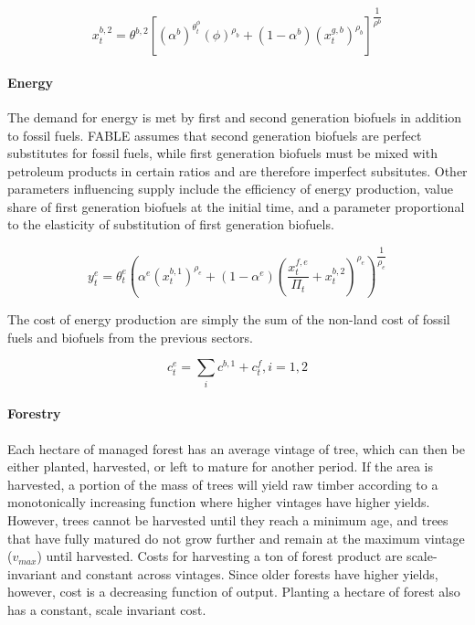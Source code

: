 \documentclass[10pt]{article}
\begin{document}
\begin{equation}
x_t^{b,2} = \theta^{b,2} \left [ \left (\alpha^b \right )^{\theta_t^\phi} \left(\phi \right )^{\rho_b} + \left (1-\alpha^b \right ) \left (x_t^{g,b} \right )^{\rho_b} \right ]^{\dfrac{1}{\rho^b}}
\end{equation}

\paragraph{Energy}

The demand for energy is met by first and second generation biofuels in addition to fossil fuels. FABLE assumes that second generation biofuels are perfect substitutes for fossil fuels, while first generation biofuels must be mixed with petroleum products in certain ratios and are therefore imperfect subsitutes. Other parameters influencing supply include the efficiency of energy production, value share of first generation biofuels at the initial time, and a parameter proportional to the elasticity of substitution of first generation biofuels. 

\begin{equation}
y_t^e = \theta_t^e \left ( \alpha^e \left (x_t^{b,1} \right )^{\rho_e} + \left (1-\alpha^e \right ) \left (\dfrac{x_t^{f,e}}{\Pi_t} + x_t^{b,2} \right )^{\rho_e} \right )^{\dfrac{1}{\rho_e}}
\end{equation}

The cost of energy production are simply the sum of the non-land cost of fossil fuels and biofuels from the previous sectors.

\begin{equation}
c_t^e = \sum \limits_i c^{b,1} + c_t^f , i = 1, 2
\end{equation}

\paragraph{Forestry}

Each hectare of managed forest has an average vintage of tree, which can then be either planted, harvested, or left to mature for another period. If the area is harvested, a portion of the mass of trees will yield raw timber according to a monotonically increasing function where higher vintages have higher yields. However, trees cannot be harvested until they reach a minimum age, and trees that have fully matured do not grow further and remain at the maximum vintage ($v_{max}$) until harvested. Costs for harvesting a ton of forest product are scale-invariant and constant across vintages. Since older forests have higher yields, however, cost is a decreasing function of output. Planting a hectare of forest also has a constant, scale invariant cost.
\end{document}
